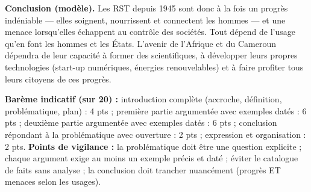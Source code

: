 \documentclass[11pt]{article}
\begin{document}
\begin{corrige}
\textbf{Conclusion (modèle).} Les RST depuis 1945 sont donc à la fois un progrès indéniable — elles soignent, nourrissent et connectent les hommes — et une menace lorsqu'elles échappent au contrôle des sociétés. Tout dépend de l'usage qu'en font les hommes et les États. L'avenir de l'Afrique et du Cameroun dépendra de leur capacité à former des scientifiques, à développer leurs propres technologies (start-up numériques, énergies renouvelables) et à faire profiter tous leurs citoyens de ces progrès.

\textbf{Barème indicatif (sur 20) :} introduction complète (accroche, définition, problématique, plan) : 4 pts ; première partie argumentée avec exemples datés : 6 pts ; deuxième partie argumentée avec exemples datés : 6 pts ; conclusion répondant à la problématique avec ouverture : 2 pts ; expression et organisation : 2 pts.
\textbf{Points de vigilance :} la problématique doit être une question explicite ; chaque argument exige au moins un exemple précis et daté ; éviter le catalogue de faits sans analyse ; la conclusion doit trancher nuancément (progrès ET menaces selon les usages).
\end{corrige}
\end{document}
